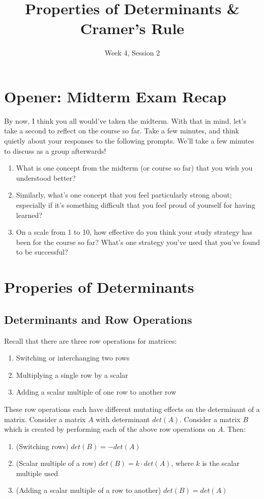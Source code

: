 \documentclass[11pt]{exam}
\title{Properties of Determinants \& Cramer's Rule}
\date{Week 4, Session 2}
\begin{document}
\maketitle

\section{Opener: Midterm Exam Recap}

By now, I think you all would've taken the midterm. With that in mind, let's take a second to reflect on the course so far. Take a
few minutes, and think quietly about your responses to the following prompts. We'll take a few minutes to discuss as a group afterwards!
\begin{enumerate}
    \item What is one concept from the midterm (or course so far) that you wish you understood better?
    \item Similarly, what's one concept that you feel particularly strong about; especially if it's something difficult that you feel
    proud of yourself for having learned?
    \item On a scale from 1 to 10, how effective do you think your study strategy has been for the course so far? What's one strategy
    you've used that you've found to be successful?
\end{enumerate}


\pagebreak
\section{Properies of Determinants}
    
    \vspace{20px}
    \subsection{Determinants and Row Operations}
    Recall that there are three row operations for matrices:
    \begin{enumerate}
        \item Switching or interchanging two rows
        \item Multiplying a single row by a scalar
        \item Adding a scalar multiple of one row to another row
    \end{enumerate}
    These row operations each have different mutating effects on the determinant of a matrix. Consider a matrix $A$ with determinant
    $det(A)$. Consider a matrix $B$ which is created by performing each of the above row operations on $A$. Then:
    \begin{enumerate}
        \item (Switching rows) $det(B) = -det(A)$
        \item (Scalar multiple of a row) $det(B) = k \cdot det(A)$, where $k$ is the scalar multiple used
        \item (Adding a scalar multiple of a row to another) $det(B) = det(A)$
    \end{enumerate}
\end{document}
